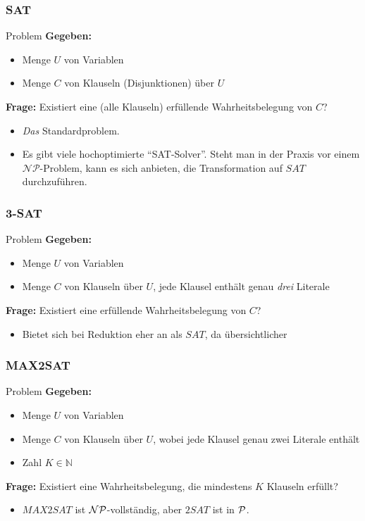 \begin{frame}
\frametitle{SAT}
\begin{block}{Problem}
\textbf{Gegeben:}
\begin{itemize}
 \item Menge $U$ von Variablen
 \item Menge $C$ von Klauseln (Disjunktionen) über $U$
\end{itemize}
\textbf{Frage:} Existiert eine (alle Klauseln) erfüllende Wahrheitsbelegung von $C$?
\end{block}
\begin{itemize}
\item \emph{Das} Standardproblem.
\item Es gibt viele hochoptimierte "`SAT-Solver"'. Steht man in der Praxis vor einem $\mathcal{NP}$-Problem, kann es sich anbieten, die Transformation auf $SAT$ durchzuführen.
\end{itemize}
\end{frame}
\begin{frame}
\frametitle{3-SAT}
\begin{block}{Problem}
\textbf{Gegeben:}
\begin{itemize}
 \item Menge $U$ von Variablen
 \item Menge $C$ von Klauseln über $U$, jede Klausel enthält genau \emph{drei} Literale
\end{itemize}
\textbf{Frage:} Existiert eine erfüllende Wahrheitsbelegung von $C$?
\end{block}
\begin{itemize}
\item Bietet sich bei Reduktion eher an als $SAT$, da übersichtlicher
\end{itemize}
\end{frame}
\begin{frame}
\frametitle{MAX2SAT}
\begin{block}{Problem}
\textbf{Gegeben:}
\begin{itemize}
 \item Menge $U$ von Variablen
 \item Menge $C$ von Klauseln über $U$, wobei jede Klausel genau zwei Literale enthält
 \item Zahl $K \in \mathbb{N}$
\end{itemize}
\textbf{Frage:} Existiert eine Wahrheitsbelegung, die mindestens $K$ Klauseln erfüllt?
\end{block}

\begin{itemize}
	\item $MAX2SAT$ ist $\mathcal{NP}$-vollständig, aber $2SAT$ ist in $\mathcal{P}$.
\end{itemize}
\end{frame}

